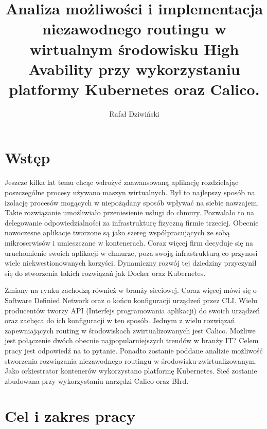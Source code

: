 \documentclass[pl,final,oneside]{mgr} %
\author{Rafał Dziwiński}
\title{Analiza możliwości i implementacja niezawodnego routingu w wirtualnym środowisku High Avability przy wykorzystaniu platformy Kubernetes oraz Calico.}
\begin{document}
\maketitle
\tableofcontents

\chapter{Wstęp}
Jeszcze kilka lat temu chcąc wdrożyć zaawansowaną aplikację rozdzielając poszczególne procesy używano maszyn wirtualnych. Był to najlepszy sposób na izolację procesów mogących w niepożądany sposób wpływać na siebie nawzajem. Takie rozwiązanie umożliwiało przeniesienie usługi do chmury. Pozwalało to na delegowanie odpowiedzialności za infrastrukturę fizyczną firmie trzeciej. Obecnie nowoczesne aplikacje tworzone są jako szereg współpracujących ze sobą mikroserwisów i umieszczane w kontenerach. Coraz więcej firm decyduje się na uruchomienie swoich aplikacji w chmurze, poza swoją infrastrukturą co przynosi wiele niekwestionowanych korzyści. Dynamiczny rozwój tej dziedziny przyczynił się do stworzenia takich rozwiązań jak Docker oraz Kubernetes.

Zmiany na rynku zachodzą również w branży sieciowej. Coraz więcej mówi się o Software Definied Network oraz o końcu konfiguracji urządzeń przez CLI. Wielu producentów tworzy API (Interfejs programowania aplikacji) do swoich urządzeń oraz zachęca do ich konfiguracji w ten sposób. Jednym z wielu rozwiązań zapewniających routing w środowiskach zwirtualizowanych jest Calico.  Możliwe jest połączenie dwóch obecnie najpopularniejszych trendów w branży IT? Celem pracy jest odpowiedź na to pytanie. Ponadto zostanie poddane analizie możliwość stworzenia rozwiązania niezawodnego routingu w środowisku zwirtualizowanym. Jako orkiestrator kontenerów wykorzystano platformę Kubernetes. Sieć zostanie zbudowana przy wykorzystaniu narzędzi Calico oraz BIrd.

\chapter{Cel i zakres pracy}
\end{document}
